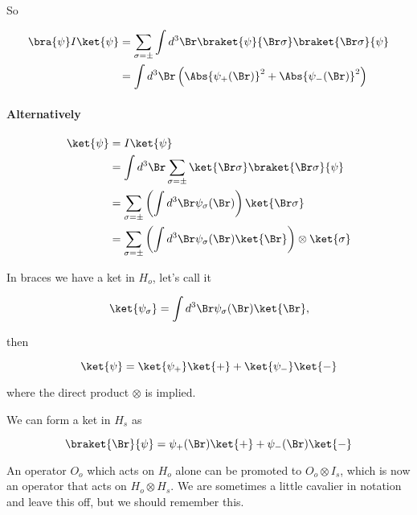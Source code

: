 So

\begin{equation}\label{eqn:qmTwoL14:720}
\begin{aligned}
\bra{\psi} I \ket{\psi} 
&= 
\sum_{\sigma = \pm} 
\int d^3 \Br \braket{\psi}{\Br \sigma} \braket{\Br \sigma}{\psi}  \\
&= 
\int d^3 \Br 
\left( 
\Abs{\psi_{+}(\Br)}^2
+
\Abs{\psi_{-}(\Br)}^2
\right)
\end{aligned}
\end{equation}

\paragraph{Alternatively}

\begin{equation}\label{eqn:qmTwoL14:740}
\begin{aligned}
\ket{\psi} 
&= I \ket{\psi} \\
&=
\int d^3 \Br 
\sum_{\sigma = \pm} 
\ket{\Br \sigma}\braket{\Br \sigma}{\psi} \\
&=
\sum_{\sigma = \pm} \left(
\int d^3 \Br \psi_\sigma(\Br)
\right)
\ket{\Br \sigma} \\
&=
\sum_{\sigma = \pm} 
\left(
\int d^3 \Br \psi_\sigma(\Br) \ket{\Br}
\right)
\otimes \ket{\sigma} 
\end{aligned}
\end{equation}

In braces we have a ket in $H_o$, let's call it

\begin{equation}\label{eqn:qmTwoL14:760}
\ket{\psi_\sigma} = \int d^3 \Br \psi_\sigma(\Br) \ket{\Br},
\end{equation}

then

\begin{equation}\label{eqn:qmTwoL14:780}
\ket{\psi} = \ket{\psi_{+}} \ket{+} + \ket{\psi_{-}} \ket{-}
\end{equation}

where the direct product $\otimes$ is implied.

We can form a ket in $H_s$ as

\begin{equation}\label{eqn:qmTwoL14:800}
\braket{\Br}{\psi} = \psi_{+}(\Br) \ket{+} + \psi_{-}(\Br) \ket{-}
\end{equation}

An operator $O_o$ which acts on $H_o$ alone can be promoted to $O_o \otimes I_s$, which is now an operator that acts on $H_o \otimes H_s$.  We are sometimes a little cavalier in notation and leave this off, but we should remember this.

